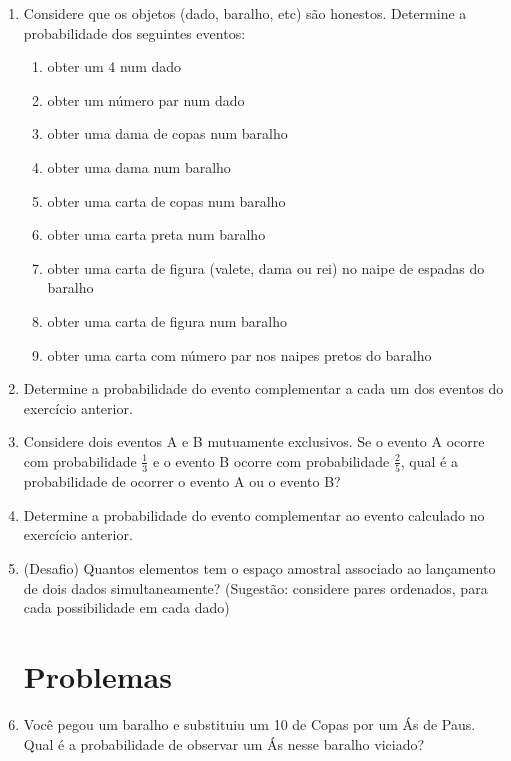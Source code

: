 \documentclass[a4paper]{article}
\begin{document}
\begin{enumerate}
\item Considere que os objetos (dado, baralho, etc) são
  honestos. Determine a probabilidade dos seguintes eventos:

  \begin{enumerate}
  \item obter um 4 num dado 
  \item obter um número par num dado 
  \item obter uma dama de copas num baralho 
  \item obter uma dama num baralho 
  \item obter uma carta de copas num baralho
  \item obter uma carta preta num baralho
  \item obter uma carta de figura (valete, dama ou rei) no naipe de
    espadas do baralho
  \item obter uma carta de figura num baralho
  \item obter uma carta com número par nos naipes pretos do baralho
  \end{enumerate}

\item Determine a probabilidade do evento complementar a cada um dos
  eventos do exercício anterior.

\item Considere dois eventos A e B mutuamente exclusivos. Se o evento
  A ocorre com probabilidade $\frac{1}{3}$ e o evento B ocorre com
  probabilidade $\frac{2}{5}$, qual é a probabilidade de ocorrer o
  evento A ou o evento B? 

\item Determine a probabilidade do evento complementar ao evento
  calculado no exercício anterior.

\item (Desafio) Quantos elementos tem o espaço amostral associado ao
  lançamento de dois dados simultaneamente? (Sugestão: considere pares
  ordenados, para cada possibilidade em cada dado)

\section{Problemas}

\item Você pegou um baralho e substituiu um 10 de Copas por um Ás de
  Paus. Qual é a probabilidade de observar um Ás nesse baralho
  viciado?


\end{enumerate}
\end{document}
